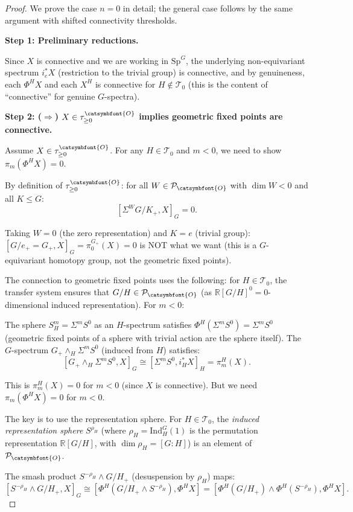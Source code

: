 \documentclass[12pt]{article}
\theoremstyle{definition}
\newcommand{\aO}{{\catsymbfont{O}}}
\begin{document}
\begin{proof}
We prove the case $n=0$ in detail; the general case follows by the same argument with shifted connectivity thresholds.

\textbf{Step 1: Preliminary reductions.}

Since $X$ is connective and we are working in $\mathrm{Sp}^G$, the underlying non-equivariant spectrum $i_e^* X$ (restriction to the trivial group) is connective, and by genuineness, each $\Phi^H X$ and each $X^H$ is connective for $H\notin\mathcal{T}_0$ (this is the content of ``connective'' for genuine $G$-spectra).

\textbf{Step 2: ($\Rightarrow$) $X\in\tau_{\geq 0}^{\aO}$ implies geometric fixed points are connective.}

Assume $X\in\tau_{\geq 0}^{\aO}$. For any $H\in\mathcal{T}_0$ and $m < 0$, we need to show $\pi_m(\Phi^H X) = 0$.

By definition of $\tau_{\geq 0}^{\aO}$: for all $W\in\mathcal{P}_\aO$ with $\dim W < 0$ and all $K\leq G$:
$$[\Sigma^W G/K_+, X]_G = 0.$$

Taking $W = 0$ (the zero representation) and $K = e$ (trivial group): $[G/e_+ = G_+, X]_G = \pi_0^{G_+}(X) = 0$ is NOT what we want (this is a $G$-equivariant homotopy group, not the geometric fixed points).

The connection to geometric fixed points uses the following: for $H\in\mathcal{T}_0$, the transfer system ensures that $G/H\in\mathcal{P}_\aO$ (as $\mathbb{R}[G/H]^0 = 0$-dimensional induced representation). For $m < 0$:

The sphere $S^m_H = \Sigma^m S^0$ as an $H$-spectrum satisfies $\Phi^H(\Sigma^m S^0) = \Sigma^m S^0$ (geometric fixed points of a sphere with trivial action are the sphere itself). The $G$-spectrum $G_+\wedge_H \Sigma^m S^0$ (induced from $H$) satisfies:
$$[G_+\wedge_H\Sigma^m S^0, X]_G \cong [\Sigma^m S^0, i_H^* X]_H = \pi_m^H(X).$$

This is $\pi_m^H(X) = 0$ for $m<0$ (since $X$ is connective). But we need $\pi_m(\Phi^H X) = 0$ for $m<0$.

The key is to use the representation sphere. For $H\in\mathcal{T}_0$, the \emph{induced representation sphere} $S^{\rho_H}$ (where $\rho_H = \mathrm{Ind}_H^G(1)$ is the permutation representation $\mathbb{R}[G/H]$, with $\dim\rho_H = [G:H]$) is an element of $\mathcal{P}_\aO$.

The smash product $S^{-\rho_H}\wedge G/H_+$ (desuspension by $\rho_H$) maps:
$$[S^{-\rho_H}\wedge G/H_+, X]_G \cong [\Phi^H(G/H_+\wedge S^{-\rho_H}), \Phi^H X] = [\Phi^H(G/H_+)\wedge\Phi^H(S^{-\rho_H}), \Phi^H X].$$


\end{proof}
\end{document}
